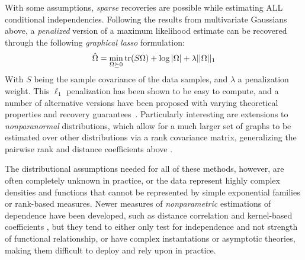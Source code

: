 With some assumptions, \textit{sparse} recoveries are possible while estimating ALL conditional independencies. Following the results from multivariate Gaussians above,
a \textit{penalized} version of a maximum likelihood estimate can be recovered through the following \textit{graphical lasso} \citep{friedman2008sparse} formulation:
\begin{align}\label{eq:glasso}
    \hat{\Omega} = \min_{\Omega \succeq 0} \operatorname{tr}(S\Omega) + \log|\Omega| + \lambda||\Omega||_1
\end{align}
With $S$ being the sample covariance of the data samples, and $\lambda$ a penalization weight. This $\ell_1$ penalization has been shown to be easy to compute, and a number of alternative versions have been proposed with varying theoretical properties and recovery guarantees~\citep{cai2011constrained,yuan2010high}.
Particularly interesting are extensions to \textit{nonparanormal} distributions, which allow for a much larger set of graphs to be estimated over other distributions via a rank covariance matrix, generalizing the pairwise rank and distance coefficients above \citep{liu2009nonparanormal,xue2012regularized}.

The distributional assumptions needed for all of these methods, however, are often completely unknown in practice, or the data represent highly complex densities and functions that cannot be represented by simple exponential families or rank-based measures.
Newer measures of \textit{nonparametric} estimations of dependence have been developed, such as distance correlation and kernel-based coefficients \citep{szekely2014partial,wang2015conditional,doran2014permutation}, but they tend to either only test for independence and not strength of functional relationship, or have complex instantations or asymptotic theories, making them difficult to deploy and rely upon in practice.

